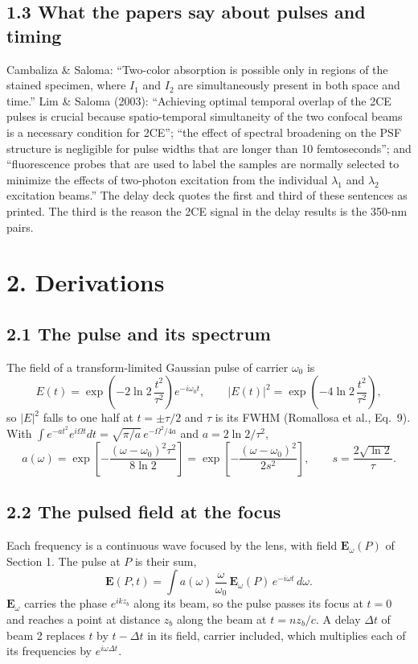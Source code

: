 \documentclass[10pt]{article}
\begin{document}
\subsection*{1.3 What the papers say about pulses and timing}
Cambaliza \& Saloma: ``Two-color absorption is possible only in regions of the stained specimen, where $I_1$ and
$I_2$ are simultaneously present in both space and time.'' Lim \& Saloma (2003): ``Achieving optimal temporal
overlap of the 2CE pulses is crucial because spatio-temporal simultaneity of the two confocal beams is a necessary
condition for 2CE''; ``the effect of spectral broadening on the PSF structure is negligible for pulse widths that are
longer than 10 femtoseconds''; and ``fluorescence probes that are used to label the samples are normally selected to
minimize the effects of two-photon excitation from the individual $\lambda_1$ and $\lambda_2$ excitation beams.''
The delay deck quotes the first and third of these sentences as printed. The third is the reason the 2CE signal in
the delay results is the 350-nm pairs.

\section*{2. Derivations}
\subsection*{2.1 The pulse and its spectrum}
The field of a transform-limited Gaussian pulse of carrier $\omega_0$ is
\begin{equation}E(t) = \exp\!\left(-2\ln 2\,\frac{t^2}{\tau^2}\right)e^{-i\omega_0t},\qquad
|E(t)|^2 = \exp\!\left(-4\ln 2\,\frac{t^2}{\tau^2}\right),\end{equation}
so $|E|^2$ falls to one half at $t = \pm\tau/2$ and $\tau$ is its FWHM (Romallosa et al., Eq.~9). With
$\int e^{-at^2}e^{i\Omega t}dt = \sqrt{\pi/a}\,e^{-\Omega^2/4a}$ and $a = 2\ln 2/\tau^2$,
\begin{equation}a(\omega) = \exp\!\left[-\frac{(\omega-\omega_0)^2\tau^2}{8\ln 2}\right]
= \exp\!\left[-\frac{(\omega-\omega_0)^2}{2s^2}\right],\qquad s = \frac{2\sqrt{\ln 2}}{\tau}.\end{equation}

\subsection*{2.2 The pulsed field at the focus}
Each frequency is a continuous wave focused by the lens, with field $\mathbf{E}_\omega(P)$ of Section 1. The pulse at
$P$ is their sum,
\begin{equation}\mathbf{E}(P,t) = \int a(\omega)\,\frac{\omega}{\omega_0}\,\mathbf{E}_\omega(P)\,e^{-i\omega t}\,d\omega .\end{equation}
$\mathbf{E}_\omega$ carries the phase $e^{ikz_b}$ along its beam, so the pulse passes its focus at $t = 0$ and
reaches a point at distance $z_b$ along the beam at $t = nz_b/c$. A delay $\Delta t$ of beam 2 replaces $t$ by
$t - \Delta t$ in its field, carrier included, which multiplies each of its frequencies by $e^{i\omega\Delta t}$.
\end{document}
